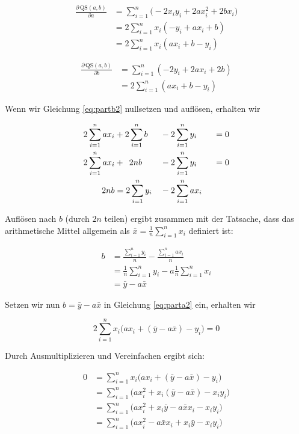 \documentclass[ngerman, 12pt,parskip=half]{scrartcl}
\def\qs{\text{QS}(a,b)}
\def\sm{\sum\limits_{i=1}^{n}}
\begin{document}
\begin{align}
\frac{\partial\, \qs}{\partial a}	&= \sm \big(-2x_iy_i + 2ax_i^2 + 2bx_i\big) \label{eq:parta1}\\
								&= 2 \sm x_i(-y_i + ax_i + b) \label{eq:parta2a} \\
								&= 2 \sm x_i(ax_i + b -y_i ) \label{eq:parta2} 
\end{align}

\begin{align}
\frac{\partial\, \qs}{\partial b}	&= \sm (-2y_i+2ax_i +2b) \label{eq:partb1}\\
								&= 2 \sm (ax_i + b -y_i) \label{eq:partb2}
\end{align}

Wenn wir Gleichung \ref{eq:partb2} nullsetzen und auflösen, erhalten wir 

\begin{alignat}{3}
2\sm ax_i &+ 2\sm b &&- 2 \sm y_i \quad &&= 0 \\
2\sm ax_i &+ \enskip 2nb &&- 2 \sm y_i \quad &&= 0 \\ 
2nb &= 2 \sm y_i &&- 2\sm ax_i && 
\end{alignat}

Auflösen nach \(b\) (durch \(2n\) teilen) ergibt zusammen mit der Tatsache, dass das arithmetische Mittel allgemein als \(\bar{x}= \frac{1}{n} \sm x_i \) definiert ist:

\begin{align}
b &= \frac{\sm y_i}{n} - \frac{\sm ax_i}{n} \\
	&= \frac{1}{n} \sm y_i - a \frac{1}{n} \sm x_i \\
	&= \bar{y} - a \bar{x}
\end{align}

Setzen wir nun \(b=\bar{y} - a \bar{x}\) in Gleichung \ref{eq:parta2} ein, erhalten wir

\begin{equation}
	2\sm x_i \big(ax_i + (\bar{y} - a \bar{x}) - y_i\big)=0
	\label{eq:einsetz}
\end{equation}

Durch Ausmultiplizieren und Vereinfachen ergibt sich:

\begin{align}
  0 &= \sm x_i \big(ax_i + (\bar{y} - a \bar{x}) - y_i\big) \\
	&= \sm \big(ax_i^2+x_i(\bar{y}-a\bar{x})-x_iy_i \big) \\
     &= \sm \big(ax_i^2 + x_i\bar{y} - a\bar{x}x_i- x_iy_i \big) \\
     &= \sm \big(ax_i^2 - a\bar{x}x_i + x_i\bar{y} - x_iy_i \big) 
\end{align}
\end{document}
